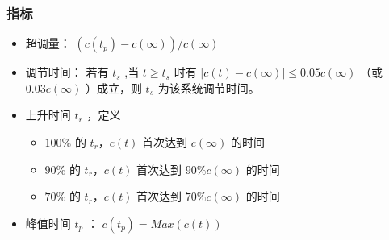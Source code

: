 \documentclass{article}
\begin{document}
\begin{frame}
\frametitle{指标}
\label{sec-3-2-3}

\begin{itemize}
\item 超调量：  $(c(t_p)-c(\infty))/c(\infty)$
\item 调节时间： 若有 $t_s$ ,当 $t\geq t_s$ 时有 $|c(t)-c(\infty)|\leq 0.05c(\infty)$ （或 $0.03c(\infty)$ ）成立，则 $t_s$ 为该系统调节时间。
\item 上升时间 $t_r$ ，定义
\begin{itemize}
\item $100\%$ 的 $t_r，c(t)$ 首次达到 $c(\infty)$ 的时间
\item $90\%$ 的 $t_r，c(t)$ 首次达到 $90\%c(\infty)$ 的时间
\item $70\%$ 的 $t_r，c(t)$ 首次达到 $70\%c(\infty)$ 的时间
\end{itemize}
\item 峰值时间 $t_p$ ： $c(t_p)=Max(c(t))$
\end{itemize}
\end{frame}
\end{document}

